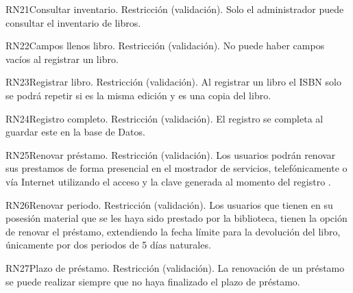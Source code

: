 \begin{BussinesRule}{RN21}{Consultar inventario.} 
	\BRitem[Tipo:] Restricción (validación).
	\BRitem[Descripción:]Solo el administrador puede consultar el inventario de libros.
\end{BussinesRule}

\begin{BussinesRule}{RN22}{Campos llenos libro.} 
	\BRitem[Tipo:] Restricción (validación).
	\BRitem[Descripción:]No puede haber campos vacíos al registrar un libro.
\end{BussinesRule}

\begin{BussinesRule}{RN23}{Registrar libro.} 
	\BRitem[Tipo:] Restricción (validación).
	\BRitem[Descripción:]Al registrar un libro el ISBN solo se podrá repetir si es la misma edición y es una copia del libro.
\end{BussinesRule}

\begin{BussinesRule}{RN24}{Registro completo.} 
	\BRitem[Tipo:] Restricción (validación).
	\BRitem[Descripción:]El registro se completa al guardar este en la base de Datos.
\end{BussinesRule}

\begin{BussinesRule}{RN25}{Renovar préstamo.} 
	\BRitem[Tipo:] Restricción (validación).
	\BRitem[Descripción:]Los usuarios podrán renovar sus prestamos de forma presencial en el mostrador de servicios, telefónicamente o vía Internet utilizando el acceso y la clave generada al momento del registro .
\end{BussinesRule}

\begin{BussinesRule}{RN26}{Renovar periodo.} 
	\BRitem[Tipo:] Restricción (validación).
	\BRitem[Descripción:]Los usuarios que tienen en su posesión material que se les haya sido prestado por la biblioteca, tienen la opción de renovar el préstamo, extendiendo la fecha límite para la devolución del libro, únicamente por dos periodos de 5 días naturales.
\end{BussinesRule}

\begin{BussinesRule}{RN27}{Plazo de préstamo.} 
	\BRitem[Tipo:] Restricción (validación).
	\BRitem[Descripción:]La renovación de un préstamo se puede realizar siempre que no haya finalizado el plazo de préstamo.
\end{BussinesRule}

